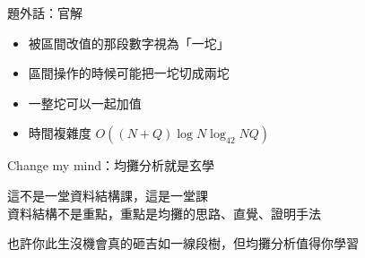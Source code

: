 \begin{frame}{}
    題外話：官解

    \begin{itemize}
        \item 被區間改值的那段數字視為「一坨」
        \item 區間操作的時候可能把一坨切成兩坨
        \item 一整坨可以一起加值
        \item 時間複雜度 $O((N + Q) \log N \log_{42} NQ)$
    \end{itemize}
\end{frame}

\begin{frame}{\ebtitle}
    Change my mind：均攤分析就是玄學
\end{frame}

\begin{frame}{}
    這不是一堂資料結構課，這是一堂課 \\
    資料結構不是重點，重點是均攤的思路、直覺、證明手法

    也許你此生沒機會真的砸吉如一線段樹，但均攤分析值得你學習
\end{frame}
